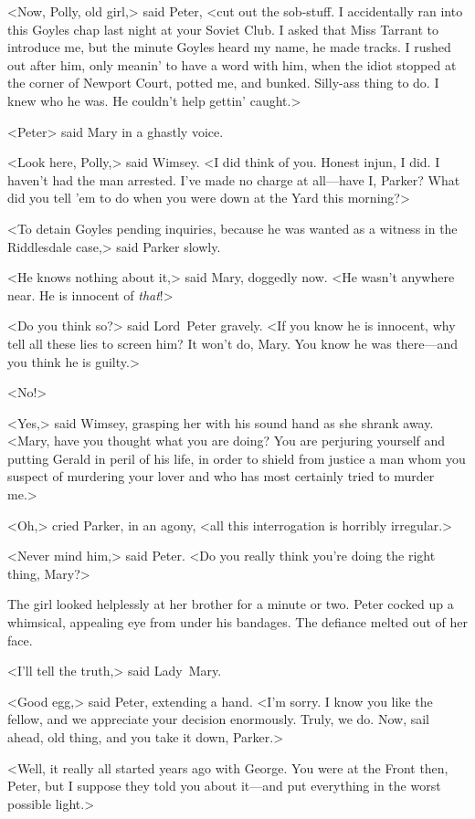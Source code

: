 <Now, Polly, old girl,> said Peter, <cut out the sob-stuff. I accidentally ran into this Goyles chap last night at your Soviet Club.  I asked that Miss Tarrant to introduce me, but the minute Goyles heard my name, he made tracks. I rushed out after him, only meanin' to have a word with him, when the idiot stopped at the corner of Newport Court, potted me, and bunked. Silly-ass thing to do. I knew who he was. He couldn't help gettin' caught.>

<Peter\longdash> said Mary in a ghastly voice.

<Look here, Polly,> said Wimsey. <I did think of you. Honest injun, I did. I haven't had the man arrested. I've made no charge at all—have I, Parker? What did you tell 'em to do when you were down at the Yard this morning?>

<To detain Goyles pending inquiries, because he was wanted as a witness in the Riddlesdale case,> said Parker slowly.

<He knows nothing about it,> said Mary, doggedly now. <He wasn't anywhere near. He is innocent of \emph{that}!>

<Do you think so?> said Lord~Peter gravely. <If you know he is innocent, why tell all these lies to screen him? It won't do, Mary. You know he was there—and you think he is guilty.>

<No!>

<Yes,> said Wimsey, grasping her with his sound hand as she shrank away. <Mary, have you thought what you are doing? You are perjuring yourself and putting Gerald in peril of his life, in order to shield from justice a man whom you suspect of murdering your lover and who has most certainly tried to murder me.>

<Oh,> cried Parker, in an agony, <all this interrogation is horribly irregular.>

<Never mind him,> said Peter. <Do you really think you're doing the right thing, Mary?>

The girl looked helplessly at her brother for a minute or two. Peter cocked up a whimsical, appealing eye from under his bandages. The defiance melted out of her face.

<I'll tell the truth,> said Lady~Mary.

<Good egg,> said Peter, extending a hand. <I'm sorry. I know you like the fellow, and we appreciate your decision enormously. Truly, we do.  Now, sail ahead, old thing, and you take it down, Parker.>

<Well, it really all started years ago with George. You were at the Front then, Peter, but I suppose they told you about it—and put everything in the worst possible light.>

